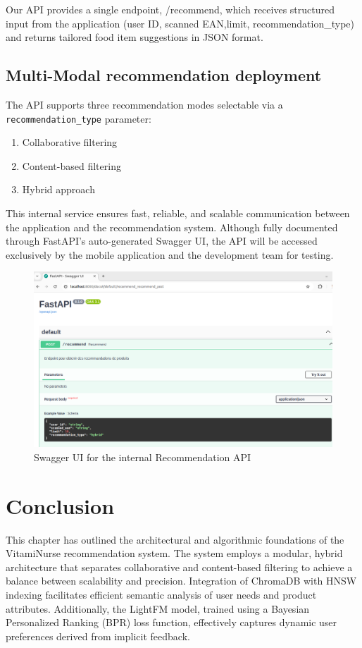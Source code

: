 \par Our API provides a single endpoint, /recommend, which receives structured input from the application (user ID, scanned EAN,limit, recommendation\_type) and returns tailored food item suggestions in JSON format.


\subsection{Multi-Modal recommendation deployment}
The API supports three recommendation modes selectable via a \texttt{recommendation\_type} parameter: 
\begin{enumerate}
    \item Collaborative filtering
    \item Content-based filtering
    \item Hybrid approach
\end{enumerate}

This internal service ensures fast, reliable, and scalable communication between the application and the recommendation system. Although fully documented through FastAPI’s auto-generated Swagger UI, the API will be accessed exclusively by the mobile application and the development team for testing.
 \begin{center}
    \begin{figure}[H]
        \includegraphics[scale=0.41]{images/swaggerFastAPI.png}
    \caption{Swagger UI for the internal Recommendation API} 
    \label{fig:swagger_UI}
\end{figure}
\end{center}

\section*{Conclusion}
This chapter has outlined the architectural and algorithmic foundations of the VitamiNurse recommendation system. 
The system employs a modular, hybrid architecture that separates collaborative and content-based filtering to achieve a balance between scalability and precision. 
Integration of ChromaDB with HNSW indexing facilitates efficient semantic analysis of user needs and product attributes. 
Additionally, the LightFM model, trained using a Bayesian Personalized Ranking (BPR) loss function, effectively captures dynamic user preferences derived from implicit feedback.

